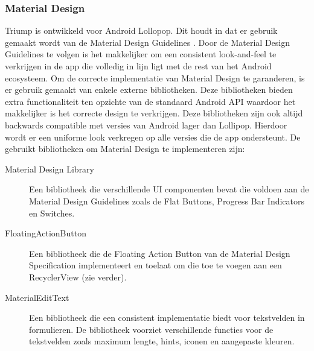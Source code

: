 \subsubsection{Material Design}
Triump is ontwikkeld voor Android Lollopop. Dit houdt in dat er gebruik gemaakt wordt van de Material Design Guidelines \cite{Material_Design}. Door de Material Design Guidelines te volgen is het makkelijker om een consistent look-and-feel te verkrijgen in de app die volledig in lijn ligt met de rest van het Android ecosysteem.
Om de correcte implementatie van Material Design te garanderen, is er gebruik gemaakt van enkele externe bibliotheken. Deze bibliotheken bieden extra functionaliteit ten opzichte van de standaard Android API waardoor het makkelijker is het correcte design te verkrijgen. Deze bibliotheken zijn ook altijd backwards compatible met versies van Android lager dan Lollipop. Hierdoor wordt er een uniforme look verkregen op alle versies die de app ondersteunt.
De gebruikt bibliotheken om Material Design te implementeren zijn:
\begin{description}
\item[Material Design Library \cite{navasmdc}] Een bibliotheek die verschillende UI componenten bevat die voldoen aan de Material Design Guidelines zoals de Flat Buttons, Progress Bar Indicators en Switches.
\item[FloatingActionButton \cite{floatingactionbutton}] Een bibliotheek die de Floating Action Button van de Material Design Specification implementeert en toelaat om die toe te voegen aan een RecyclerView (zie verder).
\item[MaterialEditText \cite{materialedittext}] Een bibliotheek die een consistent implementatie biedt voor tekstvelden in formulieren. De bibliotheek voorziet verschillende functies voor de tekstvelden zoals maximum lengte, hints, iconen en aangepaste kleuren.
\end{description}

